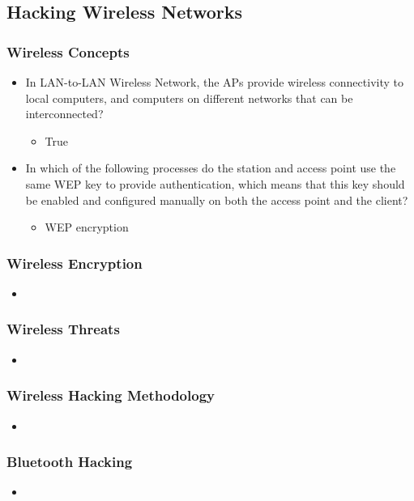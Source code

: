 \subsection{Hacking Wireless Networks}
\subsubsection{Wireless Concepts}
\begin{itemize}
    \item In LAN-to-LAN Wireless Network, the APs provide wireless connectivity to local computers, and computers on different networks that can be interconnected?
    \begin{itemize}
        \item True
    \end{itemize}
    \item In which of the following processes do the station and access point use the same WEP key to provide authentication, which means that this key should be enabled and configured manually on both the access point and the client?
    \begin{itemize}
        \item WEP encryption
    \end{itemize}
\end{itemize}
\subsubsection{Wireless Encryption}
\begin{itemize}
    \item 
\end{itemize}
\subsubsection{Wireless Threats}
\begin{itemize}
    \item 
\end{itemize}
\subsubsection{Wireless Hacking Methodology}
\begin{itemize}
    \item 
\end{itemize}
\subsubsection{Bluetooth Hacking}
\begin{itemize}
    \item 
\end{itemize}
